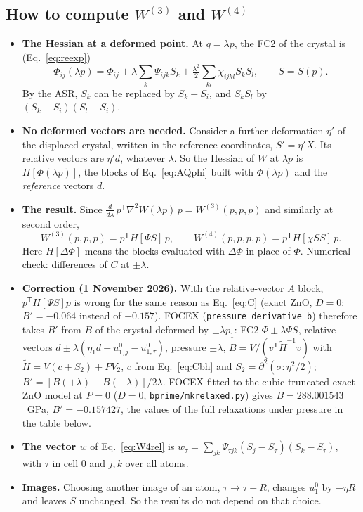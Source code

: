 \documentclass[11pt,a4paper]{article}
\newcommand{\la}{\lambda}\newcommand{\ep}{\varepsilon}\newcommand{\si}{\sigma}\newcommand{\Ga}{\Gamma}
\newcommand{\Wt}{W^{(3)}}\newcommand{\Wf}{W^{(4)}}
\begin{document}
\subsection{How to compute \texorpdfstring{$\Wt$}{W3} and \texorpdfstring{$\Wf$}{W4}}
\begin{itemize}
\item \textbf{The Hessian at a deformed point.} At $q=\la p$, the FC2 of the crystal is
  (Eq.~\eqref{eq:reexp})
  \[
  \Phi_{ij}(\la p)=\Phi_{ij}+\la\sum_k\Psi_{ijk}S_k+\tfrac{\la^2}2\sum_{kl}\chi_{ijkl}S_kS_l,\qquad S=S(p).
  \]
  By the ASR, $S_k$ can be replaced by $S_k-S_i$, and $S_kS_l$ by $(S_k-S_i)(S_l-S_i)$.
\item \textbf{No deformed vectors are needed.} Consider a further deformation $\eta'$ of the displaced crystal, written in the reference
  coordinates, $S'=\eta'X$. Its relative vectors are $\eta'd$, whatever $\la$. So the Hessian of $W$ at
  $\la p$ is $H[\Phi(\la p)]$, the blocks of Eq.~\eqref{eq:AQphi} built with $\Phi(\la p)$ and the
  \emph{reference} vectors $d$.
\item \textbf{The result.} Since $\frac{d}{d\la}\,p^{\mathsf T}\nabla^2W(\la p)\,p=\Wt(p,p,p)$ and similarly at second order,
\begin{equation}
\Wt(p,p,p)=p^{\mathsf T}H[\Psi S]\,p,\qquad \Wf(p,p,p,p)=p^{\mathsf T}H[\chi SS]\,p .
\label{eq:Wcompute}
\end{equation}
  Here $H[\Delta\Phi]$ means the blocks evaluated with $\Delta\Phi$ in place of $\Phi$.
  Numerical check: differences of $C$ at $\pm\la$.
\item \textbf{Correction (1 November 2026).} With the relative-vector $A$ block, $p^{\mathsf T}H[\Psi S]p$ is wrong
  for the same reason as Eq.~\eqref{eq:C} (exact ZnO, $D=0$: $B'=-0.064$ instead of $-0.157$). FOCEX
  (\texttt{pressure\_derivative\_b}) therefore takes $B'$ from $B$ of the crystal deformed by $\pm\la p_1$:
  FC2 $\Phi\pm\la\Psi S$, relative vectors $d\pm\la(\eta_1d+u^0_{1,j}-u^0_{1,\tau})$, pressure $\pm\la$,
  $B=V/(v^{\mathsf T}\tilde H^{-1}v)$ with $\tilde H=V(c+S_2)+PV_2$, $c$ from Eq.~\eqref{eq:Cbh} and
  $S_2=\partial^2(\si:\eta^2/2)$; $B'=[B(+\la)-B(-\la)]/2\la$. FOCEX fitted to the cubic-truncated exact ZnO model
  at $P=0$ ($D=0$, \texttt{bprime/mkrelaxed.py}) gives $B=288.001543$~GPa, $B'=-0.157427$, the values of the full
  relaxations under pressure in the table below.
\item \textbf{The vector $w$} of Eq.~\eqref{eq:W4rel} is $w_\tau=\sum_{jk}\Psi_{\tau jk}(S_j-S_\tau)(S_k-S_\tau)$, with $\tau$ in
  cell 0 and $j,k$ over all atoms.
\item \textbf{Images.} Choosing another image of an atom, $\tau\to\tau+R$, changes $u^0_1$ by $-\eta R$ and leaves $S$
  unchanged. So the results do not depend on that choice.
\end{itemize}
\end{document}
